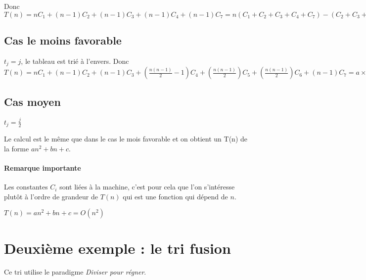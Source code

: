 Donc $T(n) = nC_1 + (n-1)C_2 + (n-1)C_3 + (n-1)C_4 + (n-1)C_7 = n(C_1 + C_2
+ C_3 + C_4 + C_7) - (C_2 + C_3 + C_4 + C_7) = a\times n + b$

\subsection{Cas le moins favorable}
$t_j = j$, le tableau est trié à l'envers.
Donc $T(n) = nC_1 + (n-1)C_2 + (n-1)C_3 + (\frac{n(n-1)}{2}-1)C_4 + 
(\frac{n(n-1)}{2})C_5 +(\frac{n(n-1)}{2})C_6 +(n-1)C_7 = a\times n^2 +
b\times n + c$

\subsection{Cas moyen}
$t_j = \frac{j}{2}$

Le calcul est le même que dans le cas le mois favorable et on obtient un
T(n) de la forme $an^2 + bn + c$.

\paragraph{Remarque importante}
Les constantes $C_i$ sont liées à la machine, c'est pour cela que l'on
s'intéresse plutôt à l'ordre de grandeur de $T(n)$ qui est une fonction qui
dépend de $n$.

$T(n) = an^2 + bn + c = O(n^2)$

\section{Deuxième exemple : le tri fusion}

Ce tri utilise le paradigme \textit{Diviser pour régner}.
